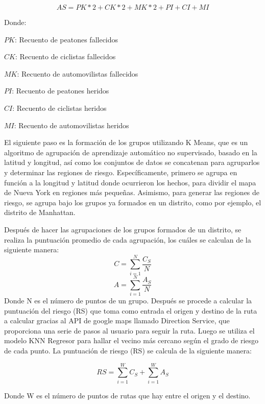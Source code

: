 \begin{equation} 
	AS = PK*2+CK*2+MK*2+PI+CI+MI
\end{equation}

	Donde:

$PK$: Recuento de peatones fallecidos

$CK$: Recuento de ciclistas fallecidos

$MK$: Recuento de automovilistas fallecidos

$PI$: Recuento de peatones heridos

$CI$: Recuento de ciclistas heridos

$MI$: Recuento de automovilistas heridos

El siguiente paso es la formación de los grupos utilizando K Means, que es un algoritmo de agrupación de aprendizaje automático no supervisado, basado en la latitud y longitud, así como los conjuntos de datos se concatenan para agruparlos y determinar las regiones de riesgo. Específicamente, primero se agrupa en función a la longitud y latitud donde ocurrieron los hechos, para dividir el mapa de Nueva York en regiones más pequeñas. Asimismo, para generar las regiones de riesgo, se agrupa bajo los grupos ya formados en un distrito, como por ejemplo, el distrito de Manhattan. 

Después de hacer las agrupaciones de los grupos formados de un distrito, se realiza la puntuación promedio de cada agrupación, los cuáles se calculan de la siguiente manera:
\begin{equation} 
	C = \sum_{i = 1}^{N}\frac{C_{S}}{N}
\end{equation}
\begin{equation} 
	A = \sum_{i = 1}^{N}\frac{A_{S}}{N}
\end{equation}
Donde N es el número de puntos de un grupo. Después se procede a calcular la puntuación del riesgo (RS) que toma como entrada el origen y destino de la ruta a calcular gracias al API de google maps llamado Direction Service,  que proporciona una serie de pasos al usuario para seguir la ruta. Luego se utiliza el modelo KNN Regresor para hallar el vecino más cercano según el grado de riesgo de cada punto. La puntuación de riesgo (RS) se calcula de la siguiente manera: 


\begin{equation} 
	RS = \sum_{i=1}^{W}C_{S} + \sum_{i=1}^{W}A_{S}
\end{equation}

Donde W es el número de puntos de rutas que hay entre el origen y el destino.

